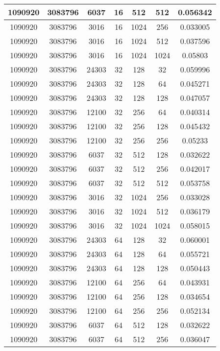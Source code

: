 \documentclass[9pt]{article}
\begin{document}
\begin{tabular}{|c|c|c|c|c|c|c| }
\hline
1090920  & 3083796  & 6037  & 16  & 512  & 512  & 0.056342 \\
\hline
1090920  & 3083796  & 3016  & 16  & 1024  & 256  & 0.033005 \\
\hline
1090920  & 3083796  & 3016  & 16  & 1024  & 512  & 0.037596 \\
\hline
1090920  & 3083796  & 3016  & 16  & 1024  & 1024  & 0.05803 \\
\hline
1090920  & 3083796  & 24303  & 32  & 128  & 32  & 0.059996 \\
\hline
1090920  & 3083796  & 24303  & 32  & 128  & 64  & 0.045271 \\
\hline
1090920  & 3083796  & 24303  & 32  & 128  & 128  & 0.047057 \\
\hline
1090920  & 3083796  & 12100  & 32  & 256  & 64  & 0.040314 \\
\hline
1090920  & 3083796  & 12100  & 32  & 256  & 128  & 0.045432 \\
\hline
1090920  & 3083796  & 12100  & 32  & 256  & 256  & 0.05233 \\
\hline
1090920  & 3083796  & 6037  & 32  & 512  & 128  & 0.032622 \\
\hline
1090920  & 3083796  & 6037  & 32  & 512  & 256  & 0.042017 \\
\hline
1090920  & 3083796  & 6037  & 32  & 512  & 512  & 0.053758 \\
\hline
1090920  & 3083796  & 3016  & 32  & 1024  & 256  & 0.033028 \\
\hline
1090920  & 3083796  & 3016  & 32  & 1024  & 512  & 0.036179 \\
\hline
1090920  & 3083796  & 3016  & 32  & 1024  & 1024  & 0.058015 \\
\hline
1090920  & 3083796  & 24303  & 64  & 128  & 32  & 0.060001 \\
\hline
1090920  & 3083796  & 24303  & 64  & 128  & 64  & 0.055721 \\
\hline
1090920  & 3083796  & 24303  & 64  & 128  & 128  & 0.050443 \\
\hline
1090920  & 3083796  & 12100  & 64  & 256  & 64  & 0.043931 \\
\hline
1090920  & 3083796  & 12100  & 64  & 256  & 128  & 0.034654 \\
\hline
1090920  & 3083796  & 12100  & 64  & 256  & 256  & 0.052134 \\
\hline
1090920  & 3083796  & 6037  & 64  & 512  & 128  & 0.032622 \\
\hline
1090920  & 3083796  & 6037  & 64  & 512  & 256  & 0.036047 \\

\end{tabular}
\end{document}
